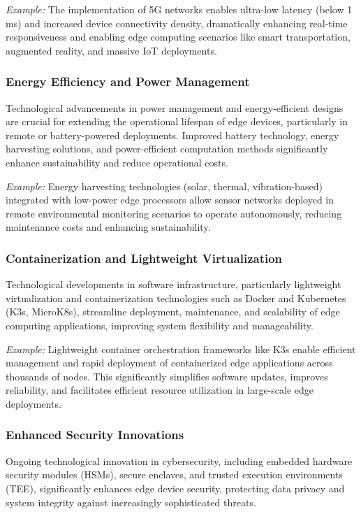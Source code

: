 \documentclass[runningheads]{llncs}
\begin{document}
\noindent\textit{Example:} The implementation of 5G networks enables ultra-low latency (below 1 ms) and increased device connectivity density, dramatically enhancing real-time responsiveness and enabling edge computing scenarios like smart transportation, augmented reality, and massive IoT deployments.

\subsubsection{Energy Efficiency and Power Management}
Technological advancements in power management and energy-efficient designs are crucial for extending the operational lifespan of edge devices, particularly in remote or battery-powered deployments. Improved battery technology, energy harvesting solutions, and power-efficient computation methods significantly enhance sustainability and reduce operational costs.

\noindent\textit{Example:} Energy harvesting technologies (solar, thermal, vibration-based) integrated with low-power edge processors allow sensor networks deployed in remote environmental monitoring scenarios to operate autonomously, reducing maintenance costs and enhancing sustainability.

\subsubsection{Containerization and Lightweight Virtualization}
Technological developments in software infrastructure, particularly lightweight virtualization and containerization technologies such as Docker and Kubernetes (K3s, MicroK8s), streamline deployment, maintenance, and scalability of edge computing applications, improving system flexibility and manageability.

\noindent\textit{Example:} Lightweight container orchestration frameworks like K3s enable efficient management and rapid deployment of containerized edge applications across thousands of nodes. This significantly simplifies software updates, improves reliability, and facilitates efficient resource utilization in large-scale edge deployments.

\subsubsection{Enhanced Security Innovations}
Ongoing technological innovation in cybersecurity, including embedded hardware security modules (HSMs), secure enclaves, and trusted execution environments (TEE), significantly enhances edge device security, protecting data privacy and system integrity against increasingly sophisticated threats.
\end{document}
